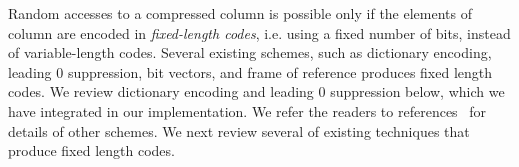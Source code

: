 %
Random accesses to a compressed column is possible only if the elements of column are encoded in \emph{fixed-length codes}, i.e. using a fixed number of bits, instead of variable-length codes. Several existing schemes, such as dictionary encoding, leading 0 suppression, bit vectors, and frame of reference produces fixed length codes. We review dictionary encoding and leading 0 suppression below, which we have integrated in our implementation. We refer the readers to references~\cite{abadi-col-comp, goldstein:for, lemire:integer} for details of other schemes.
We next review several of existing techniques that produce fixed length codes.

